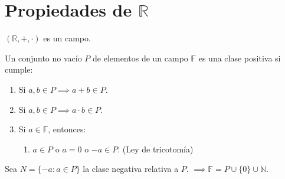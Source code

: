 \section{Propiedades de $\mathbb{R}$}

$(\mathbb{R}, +,\cdot)$ es un campo. 


\begin{definicion}
	Un conjunto no vacío $P$ de elementos de un campo $\mathbb{F}$ es una clase positiva si cumple: 
	\begin{enumerate}
		\item Si $a,b\in P\implies a+b\in P$.
		\item Si $a,b\in P\implies a\cdot b\in P$. 
		\item Si $a\in\mathbb{F}$, entonces: 
		\begin{enumerate}
			\item $a\in P$ o  $a=0$ o $-a\in P$. (Ley de tricotomía) 
		\end{enumerate}
	\end{enumerate}
\end{definicion}

\begin{nota}
	Sea $N=\{-a:a\in P\}$ la clase negativa relativa a $P$. $\implies\mathbb{F}=P\cup \{0\}\cup \mathbb{N}$.
\end{nota}

